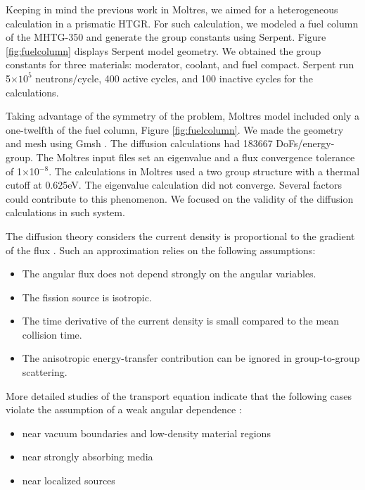\documentclass[11pt,letterpaper]{article}
\begin{document}
Keeping in mind the previous work in Moltres, we aimed for a heterogeneous calculation in a prismatic \gls{HTGR}.
For such calculation, we modeled a fuel column of the MHTG-350 and generate the group constants using Serpent.
Figure \ref{fig:fuelcolumn} displays Serpent model geometry.
We obtained the group constants for three materials: moderator, coolant, and fuel compact.
Serpent run 5$\times 10^5$ neutrons/cycle, 400 active cycles, and 100 inactive cycles for the calculations.

Taking advantage of the symmetry of the problem, Moltres model included only a one-twelfth of the fuel column, Figure \ref{fig:fuelcolumn}.
We made the geometry and mesh using Gmsh \cite{geuzaine_gmsh_2020}.
The diffusion calculations had 183667 \glspl{DoF}/energy-group.
The Moltres input files set an eigenvalue and a flux convergence tolerance of 1$\times$10$^{-8}$.
The calculations in Moltres used a two group structure with a thermal cutoff at 0.625eV.
The eigenvalue calculation did not converge.
Several factors could contribute to this phenomenon.
We focused on the validity of the diffusion calculations in such system.

The diffusion theory considers the current density is proportional to the gradient of the flux \cite{leppanen_development_2007}.
Such an approximation relies on the following assumptions:
\begin{itemize}
	\item The angular flux does not depend strongly on the angular variables.
	\item The fission source is isotropic.
	\item The time derivative of the current density is small compared to the mean collision time.
	\item The anisotropic energy-transfer contribution can be ignored in group-to-group scattering.
\end{itemize}

More detailed studies of the transport equation indicate that the following cases violate the assumption of a weak angular dependence \cite{duderstadt_nuclear_1976}:
\begin{itemize}
    \item near vacuum boundaries and low-density material regions
    \item near strongly absorbing media
    \item near localized sources
\end{itemize}
\end{document}
